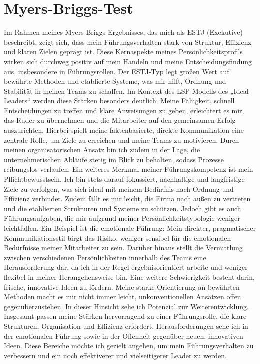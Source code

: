 \section{Myers-Briggs-Test}
Im Rahmen meines Myers-Briggs-Ergebnisses, das mich als ESTJ (Exekutive) beschreibt, zeigt sich, dass mein Führungsverhalten stark von Struktur, Effizienz und klaren Zielen geprägt ist. Diese Kernaspekte meines Persönlichkeitsprofils wirken sich durchweg positiv auf mein Handeln und meine Entscheidungsfindung aus, insbesondere in Führungsrollen. Der ESTJ-Typ legt großen Wert auf bewährte Methoden und etablierte Systeme, was mir hilft, Ordnung und Stabilität in meinen Teams zu schaffen.
Im Kontext des LSP-Modells des „Ideal Leaders“ werden diese Stärken besonders deutlich. Meine Fähigkeit, schnell Entscheidungen zu treffen und klare Anweisungen zu geben, erleichtert es mir, das Ruder zu übernehmen und die Mitarbeiter auf den gemeinsamen Erfolg auszurichten. Hierbei spielt meine faktenbasierte, direkte Kommunikation eine zentrale Rolle, um Ziele zu erreichen und meine Teams zu motivieren. Durch meinen organisatorischen Ansatz bin ich zudem in der Lage, die unternehmerischen Abläufe stetig im Blick zu behalten, sodass Prozesse reibungslos verlaufen.
Ein weiteres Merkmal meiner Führungskompetenz ist mein Pflichtbewusstsein. Ich bin stets darauf fokussiert, nachhaltige und langfristige Ziele zu verfolgen, was sich ideal mit meinem Bedürfnis nach Ordnung und Effizienz verbindet. Zudem fällt es mir leicht, die Firma nach außen zu vertreten und die etablierten Strukturen und Systeme zu schützen.
Jedoch gibt es auch Führungsaufgaben, die mir aufgrund meiner Persönlichkeitstypologie weniger leichtfallen. Ein Beispiel ist die emotionale Führung: Mein direkter, pragmatischer Kommunikationsstil birgt das Risiko, weniger sensibel für die emotionalen Bedürfnisse meiner Mitarbeiter zu sein. Darüber hinaus stellt die Vermittlung zwischen verschiedenen Persönlichkeiten innerhalb des Teams eine Herausforderung dar, da ich in der Regel ergebnisorientiert arbeite und weniger flexibel in meiner Herangehensweise bin.
Eine weitere Schwierigkeit besteht darin, frische, innovative Ideen zu fördern. Meine starke Orientierung an bewährten Methoden macht es mir nicht immer leicht, unkonventionellen Ansätzen offen gegenüberzustehen. In dieser Hinsicht sehe ich Potenzial zur Weiterentwicklung.
Insgesamt passen meine Stärken hervorragend zu einer Führungsrolle, die klare Strukturen, Organisation und Effizienz erfordert. Herausforderungen sehe ich in der emotionalen Führung sowie in der Offenheit gegenüber neuen, innovativen Ideen. Diese Bereiche möchte ich gezielt angehen, um mein Führungsverhalten zu verbessern und ein noch effektiverer und vielseitigerer Leader zu werden.
\newpage